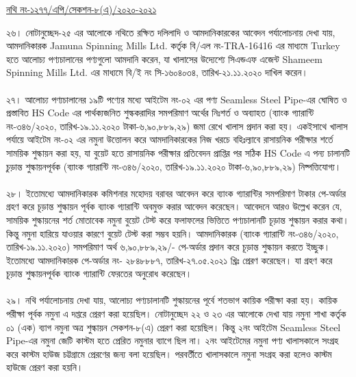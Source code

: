\documentclass[12pt]{article}
\begin{document}
\begin{flushright}
{
\underline{নথি নং-১২৭৭/এপি/সেকশন-৮(এ)/২০২০-২০২১}
}
\end{flushright}
২৬। নোটানুচ্ছেদ-২৫ এর আলোকে নথিতে রক্ষিত দলিলাদি ও
আমদানিকারকের আবেদন পর্যালোচনায় দেখা যায়, আমদানিকারক
Jamuna Spinning Mills Ltd.
কর্তৃক বি/এল নং-TRA-16416 এর মাধ্যমে Turkey হতে
আলোচ্য পণ্যচালানের পণ্যগুলো আমদানি করেন, যা খালাসের উদ্যেশ্যে
সিএন্ডএফ এজেন্ট Shameem Spinning Mills Ltd.
এর মাধ্যমে বি/ই নং সি-১৬০৪০৩৪, তারিখ-২১.১১.২০২০
দাখিল করেন।
\\
\\
২৭। আলোচ্য পণ্যচালানের ১৯টি পণ্যের মধ্যে আইটেম নং-০২
এর পণ্য Seamless Steel Pipe-এর ঘোষিত ও প্রস্তাবিত
HS Code এর পার্থক্যজনিত শুল্ককরাদির সমপরিমাণ অর্থের
নিঃশর্ত ও অব্যাহত
(ব্যাংক গ্যারান্টি নং-৩৪৬/২০২০, তারিখ-১৯.১১.২০২০ টাকা-৬,৯০,৮৮৯,২৯)
জমা রেখে খালাস প্রদান করা হয়। একইসাথে খালাস পর্যায়ে
আইটেম নং-০২ এর নমুনা উত্তোলন করে
আমদানিকারকের নিজ খরচে বহিঃল্যাবে রাসায়নিক পরীক্ষার শর্তে
সাময়িক শুল্কায়ন করা হয়, যা বুয়েট হতে রাসায়নিক পরীক্ষার প্রতিবেদন
প্রাপ্তির পর সঠিক HS Code এ পন্য চালানটি চুড়ান্ত শুল্কায়নপূর্বক
(ব্যাংক গ্যারান্টি নং-৩৪৬/২০২০, তারিখ-১৯.১১.২০২০ টাকা-৬,৯০,৮৮৯,২৯)
নিষ্পত্তিযোগ্য।
\\
\\
২৮। ইতোমধ্যে আমদানিকারক কমিশনার মহোদয় বরাবর আবেদন করে
ব্যাংক গ্যারান্টির সমপরিমাণ টাকার পে-অর্ডার গ্রহণ করে চূড়ান্ত
শুল্কায়ন পূর্বক ব্যাংক গ্যারান্টি অবমুক্ত করার আবেদন করেছেন।
আবেদনে আরও উল্লেখ করেন যে, সাময়িক শুল্কায়নের শর্ত মোতাবেক
নমুনা বুয়েট টেস্ট করে ফলাফলের ভিত্তিতে পণ্যচালানটি চূড়ান্ত শুল্কায়ন
করার কথা। কিন্তু নমুনা হারিয়ে যাওয়ার কারণে বুয়েট টেস্ট করা সম্ভব হয়নি।
আমদানিকারক
(ব্যাংক গ্যারান্টি নং-৩৪৬/২০২০, তারিখ-১৯.১১.২০২০) সমপরিমাণ অর্থ
৬,৯০,৮৮৯,২৯/- পে-অর্ডার প্রদান করে চূড়ান্ত শুল্কায়ন করতে ইচ্ছুক।
ইতোমধ্যে আমদানিকারক পে-অর্ডার নং- ২৮৪৮৮৮৭, তারিখ-২৭.০৫.২০২১ খ্রিঃ
প্রেরণ করেছেন। যা গ্রহণ করে চূড়ান্ত শুল্কায়নপূর্বক ব্যাংক গ্যারান্টি ফেরতের অনুরোধ
করেছেন।
\\
\\
২৯। নথি পর্যালোচনায় দেখা যায়, আলোচ্য পণ্যচালানটি
শুল্কায়নের পূর্বে শতভাগ কায়িক পরীক্ষা করা হয়। কায়িক পরীক্ষা
পূর্বক নমুনা এ দপ্তরে প্রেরণ করা হয়েছিল। নোটানুচ্ছেদ ২২ ও ২৩
এর আলোকে দেখা যায় নমুনা শাখা কর্তৃক ০১ (এক) ব্যাগ নমুনা
অত্র শুল্কায়ন সেকশন-৮(এ) প্রেরণ করা হয়েছিল।
কিন্তু ২নং আইটেম Seamless Steel Pipe-এর নমুনা
জেটি কাস্টম হতে প্রেরিত নমুনার ব্যাগে ছিল না। ২নং আইটেমের নমুনা
পণ্য খালাসকালে সংগ্রহ করে কাস্টম হাউজ চট্টগ্রামে প্রেরণের জন্য
বলা হয়েছিল। পরবর্তীতে খালাসকালে নমুনা সংগ্রহ করা হলেও কাস্টম
হাউজে প্রেরণ করা হয়নি।
\\
\end{document}
